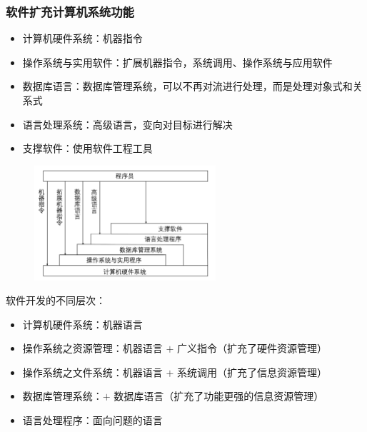 \documentclass[cs4size,a4paper,10pt]{ctexart}
\begin{document}
	\subsubsection{软件扩充计算机系统功能}
	\begin{itemize}
		\item 计算机硬件系统：机器指令
		\item 操作系统与实用软件：扩展机器指令，系统调用、操作系统与应用软件
		\item 数据库语言：数据库管理系统，可以不再对流进行处理，而是处理对象式和关系式
		\item 语言处理系统：高级语言，变向对目标进行解决
		\item 支撑软件：使用软件工程工具
	\end{itemize}
	\begin{figure}[H]
		\centering
		\includegraphics[width=0.6\textwidth]{img/1.1.3.2}
	\end{figure}
	软件开发的不同层次：
	\begin{itemize}
		\item 计算机硬件系统：机器语言
		\item 操作系统之资源管理：机器语言 $+$ 广义指令（扩充了硬件资源管理）
		\item 操作系统之文件系统：机器语言 $+$ 系统调用（扩充了信息资源管理）
		\item 数据库管理系统：$+$ 数据库语言（扩充了功能更强的信息资源管理）
		\item 语言处理程序：面向问题的语言
	\end{itemize}

	
\end{document}
